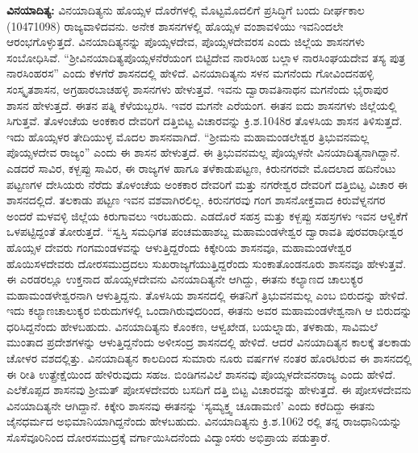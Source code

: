 \textbf{ವಿನಯಾದಿತ್ಯ:} ವಿನಯಾದಿತ್ಯನು ಹೊಯ್ಸಳ ದೊರೆಗಳಲ್ಲಿ ಮೊಟ್ಟಮೊದಲಿಗೆ ಪ್ರಸಿದ್ಧಿಗೆ ಬಂದು ದೀರ್ಘಕಾಲ (1047\enginline{-}1098) ರಾಜ್ಯವಾಳಿದವನು. ಅನೇಕ ಶಾಸನಗಳಲ್ಲಿ ಹೊಯ್ಸಳ ವಂಶಾವಳಿಯು ಇವನಿಂದಲೇ ಆರಂಭಗೊಳ್ಳುತ್ತದೆ. ವಿನಯಾದಿತ್ಯನನ್ನು ಪೊಯ್ಸಳದೇವ, ಪೊಯ್ಸಳದೇವರಸ ಎಂದು ಜಿಲ್ಲೆಯ ಶಾಸನಗಳು ಸಂಬೋಧಿಸಿವೆ. “ಶ‍್ರೀವಿನಯಾದಿತ್ಯ\-ಪೊಯ್ಸಳನೆರೆಯಂಗ ಬಿಟ್ಟಿದೇವ ನಾರಸಿಂಹ ಬಲ್ಲಾಳ ನಾರಸಿಂಘಯದೇವ ತಸ್ಯ ಪುತ್ರ ನಾರಸಿಂಹರಸ” ಎಂದು ಕೆಳಗೆರೆ ಶಾಸನದಲ್ಲಿ ಹೇಳಿದೆ. ವಿನಯಾದಿತ್ಯನು ಸಳನ ಮಗನೆಂದು ಗೋವಿಂದನಹಳ್ಳಿ ಸಂಸ್ಕೃತಶಾಸನ, ಅಗ್ರಹಾರಬಾಚಹಳ್ಳಿ ಶಾಸನಗಳು ಹೇಳುತ್ತವೆ. ಇವನು ದ್ವಾರಾವತಿನಾಥನ ಮಗನೆಂದು ಭೈರಾಪುರ ಶಾಸನ ಹೇಳುತ್ತದೆ. ಈತನ ಪತ್ನಿ ಕೆಳೆಯಬ್ಬರಸಿ. ಇವರ ಮಗನೇ ಎರೆಯಂಗ. ಈತನ ಐದು ಶಾಸನಗಳು ಜಿಲ್ಲೆಯಲ್ಲಿ ಸಿಗುತ್ತವೆ. ತೊಳಂಚೆಯ ಅಂಕಕಾರ ದೇವರಿಗೆ ದತ್ತಿಬಿಟ್ಟ ವಿಚಾರವನ್ನು ಕ್ರಿ.ಶ.1048ರ ತೊಳಸಿಯ ಶಾಸನ ತಿಳಿಸುತ್ತದೆ. ಇದು ಹೊಯ್ಸಳರ ತೇದಿಯುಳ್ಳ ಮೊದಲ ಶಾಸನವಾಗಿದೆ. “ಶ‍್ರೀಮನು ಮಹಾಮಂಡಲೇಶ್ವರ ತ್ರಿಭುವನಮಲ್ಲ ಪೊಯ್ಸಳದೇವ ರಾಜ್ಯಂ” ಎಂದು ಈ ಶಾಸನ ಹೇಳುತ್ತದೆ. ಈ ತ್ರಿಭುವನಮಲ್ಲ ಪೊಯ್ಸಳನೇ ವಿನಯಾದಿತ್ಯನಾಗಿದ್ದಾನೆ. ಎಡದರೆ ಸಾವಿರ, ಕಳ್ಬಪ್ಪು ಸಾವಿರ, ಈ ರಾಜ್ಯಗಳ ಹಾಗೂ ತಳೆಕಾಡುಪಟ್ಟಣ, ಕಿರುನಗರವೇ ಮೊದಲಾದ ಹದಿನೆಂಟು ಪಟ್ಟಣಗಳ ದೇಸಿಯರು ನೆರೆದು ತೊಳಂಚೆಯ ಅಂಕಕಾರ ದೇವರಿಗೆ ಮತ್ತು ನಗರೇಶ್ವರ ದೇವರಿಗೆ ದತ್ತಿಬಿಟ್ಟ ವಿಚಾರ ಈ ಶಾಸನದಲ್ಲಿದೆ. ತಲಕಾಡು ಪಟ್ಟಣ ಇವನ ವಶವಾಗಿರಲಿಲ್ಲ. ಕಿರುನಗರವು ಗಂಗ ಶಾಸನೋಕ್ತವಾದ ಕಿರುವೆಳ್ನನಗರ ಅಂದರೆ ಮಳವಳ್ಳಿ ಜಿಲ್ಲೆಯ ಕಿರುಗಾವಲು ಇರಬಹುದು. ಎಡದೊರೆ ಸಹಸ್ರ ಮತ್ತು ಕಳ್ಬಪ್ಪು ಸಹಸ್ರಗಳು ಇವನ ಆಳ್ವಿಕೆಗೆ ಒಳಪಟ್ಟಿದ್ದಂತೆ ತೋರುತ್ತದೆ. “ಸ್ವಸ್ತಿ ಸಮಧಿಗತ ಪಂಚಮಹಾಶಬ್ದ ಮಹಾಮಂಡಳೇಶ್ವರ ದ್ವಾರಾವತಿ ಪುರವರಾಧೀಶ್ವರ ಹೊಯ್ಸಳ ದೇವರು ಗಂಗಮಂಡಳವನ್ನು ಆಳುತ್ತಿದ್ದರೆಂದು ಕಿಕ್ಕೇರಿಯ ಶಾಸನವೂ, ಮಹಾಮಂಡಳೇಶ್ವರ ಹೊಯಿಸಳದೇವರು ದೋರಸಮುದ್ರದಲು ಸುಖರಾಜ್ಯಗೆಯುತ್ತಿದ್ದರೆಂದು ಸುಂಕಾತೊಂಡನೂರು ಶಾಸನವೂ ಹೇಳುತ್ತವೆ. ಈ ಎರಡರಲ್ಲೂ ಉಕ್ತನಾದ ಹೊಯ್ಸಳದೇವನು ವಿನಯಾದಿತ್ಯನೇ ಆಗಿದ್ದು, ಈತನು ಕಲ್ಯಾಣದ ಚಾಲುಕ್ಯರ ಮಹಾಮಂಡಳೇಶ್ವರ\-ನಾಗಿ ಆಳುತ್ತಿದ್ದನು. ತೊಳಸಿಯ ಶಾಸನದಲ್ಲಿ ಈತನಿಗೆ ತ್ರಿಭುವನಮಲ್ಲ ಎಂಬ ಬಿರುದನ್ನು ಹೇಳಿದೆ. ಇದು ಕಲ್ಯಾಣಚಾಲುಕ್ಯರ ಬಿರುದುಗಳಲ್ಲಿ ಒಂದಾಗಿರುವುದರಿಂದ, ಈತನು ಅವರ ಮಹಾಮಂಡಳೇಶ್ವನಾಗಿ ಆ ಬಿರುದನ್ನು ಧರಿಸಿದ್ದನೆಂದು ಹೇಳಬಹುದು. ವಿನಯಾದಿತ್ಯನು ಕೊಂಕಣ, ಆಳ್ವಖೇಡ, ಬಯಲ್ನಾಡು, ತಳಕಾಡು, ಸಾವಿಮಲೆ ಮುಂತಾದ ಪ್ರದೇಶಗಳನ್ನು ಆಳುತ್ತಿದ್ದನೆಂದು ಅಳೀಸಂದ್ರ ಶಾಸನದಲ್ಲಿ ಹೇಳಿದೆ. ಆದರೆ ವಿನಯಾದಿತ್ಯನ ಕಾಲಕ್ಕೆ ತಲಕಾಡು ಚೋಳರ ವಶದಲ್ಲಿತ್ತು. ವಿನಯಾದಿತ್ಯನ ಕಾಲದಿಂದ ಸುಮಾರು ನೂರು ವರ್ಷಗಳ ನಂತರ ಹೊರಟಿರುವ ಈ ಶಾಸನದಲ್ಲಿ ಈ ರೀತಿ ಉತ್ಪ್ರೇಕ್ಷೆಯಿಂದ ಹೇಳಿರುವುದು ಸಹಜ. ಬಿಂಡಿಗನವಿಲೆ ಶಾಸನವು ಪೊಯ್ಸಳದೇವನರಾಜ್ಯ ಎಂದು ಹೇಳಿದೆ. ಎಲೆಕೊಪ್ಪದ ಶಾಸನವು ಶ‍್ರೀಮತ್​ ಪೋಸಳದೇವರು ಬಸದಿಗೆ ದತ್ತಿ ಬಿಟ್ಟ ವಿಚಾರವನ್ನು ಹೇಳುತ್ತದೆ. ಈ ಪೋಸಳದೇವನು ವಿನಯಾದಿತ್ಯನೇ ಆಗಿದ್ದಾನೆ. ಕಿಕ್ಕೇರಿ ಶಾಸನವು ಈತನನ್ನು ‘ಸ್ಯಮ್ಯಕ್ತ್ವ ಚೂಡಾಮಣಿ’ ಎಂದು ಕರೆದಿದ್ದು ಈತನು ಜೈನಧರ್ಮದ ಅಭಿಮಾನಿಯಾಗಿದ್ದನೆಂದು ಹೇಳಬಹುದು. ವಿನಯಾದಿತ್ಯನು ಕ್ರಿ.ಶ.1062 ರಲ್ಲಿ ತನ್ನ ರಾಜಧಾನಿಯನ್ನು ಸೊಸೆವೂರಿನಿಂದ ದೋರಸಮುದ್ರಕ್ಕೆ ವರ್ಗಾಯಿಸಿದನೆಂದು ವಿದ್ವಾಂಸರು ಅಭಿಪ್ರಾಯ ಪಡುತ್ತಾರೆ.

